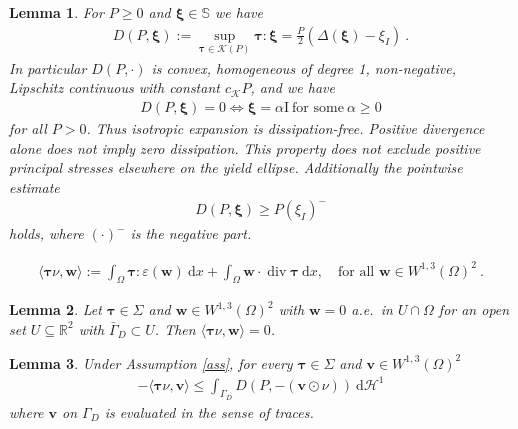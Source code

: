 \documentclass[10pt,a4paper]{amsart}
\newtheorem{lemma}{Lemma}
\newcommand{\K}{\mathcal{K}}
\newcommand{\bfI}{\boldsymbol{\mathrm{I}}}
\newcommand{\bftau}{\boldsymbol{\tau}}
\newcommand{\bfv}{\boldsymbol{v}}
\newcommand{\bfw}{\boldsymbol{w}}
\newcommand{\bfxi}{\boldsymbol{\xi}}
\newcommand{\dd}{\:\mathrm{d}}
\renewcommand\div{\operatorname{\mathrm{div}}}
\begin{document}
\begin{lemma}\label{lem:prop_D}
    For $P\geq 0$ and $\bfxi \in \mathbb S$ we have
    \begin{align}
        D(P,\bfxi) := \sup_{\bftau\in\K(P)} \bftau : \bfxi = \frac{P}{2}(\Delta(\bfxi)-\xi_I) \ .
        \label{eq:def_D}
    \end{align}
    In particular $D(P,\cdot)$ is convex, homogeneous of degree 1, non-negative,
    Lipschitz continuous with constant $c_\K P$, and we have
    \begin{align}
        D(P,\bfxi) = 0 \Leftrightarrow \bfxi = \alpha \bfI \ \text{for some}\ \alpha \geq 0 \label{eq:dissipationfree}
    \end{align}
    for all $P>0$. Thus isotropic expansion is dissipation-free. Positive
divergence alone does not imply zero dissipation. This property does not
exclude positive principal stresses elsewhere on the yield ellipse.
Additionally the pointwise estimate
    \begin{align}
        D(P, \bfxi) \geq P(\xi_I)^- \label{eq:negativ_part_D}
    \end{align}
    holds, where $(\cdot)^-$ is the negative part.
\end{lemma}

    \begin{align}
        \langle \bftau\nu, \bfw \rangle := \int_\Omega \bftau : \varepsilon(\bfw) \dd x + \int_\Omega \bfw \cdot \div \bftau \dd x, \quad\text{for all }\bfw\in W^{1,3}(\Omega)^2\ . \label{eq:normaltrace}
    \end{align}

\begin{lemma}\label{lem:a2}
    Let $\bftau \in \Sigma$ and $\bfw \in W^{1,3}(\Omega)^2$ with $\bfw =0$ a.e.\ in $U\cap \Omega$ for an open set $U\subseteq \mathbb R^2$
    with $\bar\Gamma_D \subset U$. Then $\langle \bftau\nu, \bfw \rangle =0$.
\end{lemma}

\begin{lemma}\label{lem:a3}
    Under Assumption \ref{ass}, for every $\bftau\in\Sigma$ and $\bfv \in W^{1,3}(\Omega)^2$
    \begin{align*}
        - \langle\bftau\nu,\bfv\rangle \leq \int_{\Gamma_D} D(P, -(\bfv\odot \nu)) \dd \mathcal{H}^1
    \end{align*}
    where $\bfv$ on $\Gamma_D$ is evaluated in the sense of traces.
\end{lemma}
\end{document}
